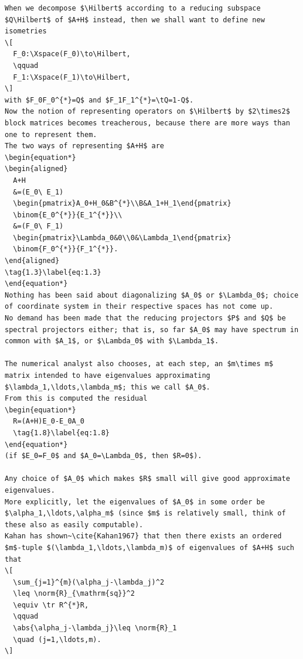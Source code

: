 \begin{verbatim}
When we decompose $\Hilbert$ according to a reducing subspace $Q\Hilbert$ of $A+H$ instead, then we shall want to define new isometries
\[
  F_0:\Xspace(F_0)\to\Hilbert,
  \qquad
  F_1:\Xspace(F_1)\to\Hilbert,
\]
with $F_0F_0^{*}=Q$ and $F_1F_1^{*}=\tQ=1-Q$.
Now the notion of representing operators on $\Hilbert$ by $2\times2$ block matrices becomes treacherous, because there are more ways than one to represent them.
The two ways of representing $A+H$ are
\begin{equation*}
\begin{aligned}
  A+H
  &=(E_0\ E_1)
  \begin{pmatrix}A_0+H_0&B^{*}\\B&A_1+H_1\end{pmatrix}
  \binom{E_0^{*}}{E_1^{*}}\\
  &=(F_0\ F_1)
  \begin{pmatrix}\Lambda_0&0\\0&\Lambda_1\end{pmatrix}
  \binom{F_0^{*}}{F_1^{*}}.
\end{aligned}
\tag{1.3}\label{eq:1.3}
\end{equation*}
Nothing has been said about diagonalizing $A_0$ or $\Lambda_0$; choice of coordinate system in their respective spaces has not come up.
No demand has been made that the reducing projectors $P$ and $Q$ be spectral projectors either; that is, so far $A_0$ may have spectrum in common with $A_1$, or $\Lambda_0$ with $\Lambda_1$.

The numerical analyst also chooses, at each step, an $m\times m$ matrix intended to have eigenvalues approximating $\lambda_1,\ldots,\lambda_m$; this we call $A_0$.
From this is computed the residual
\begin{equation*}
  R=(A+H)E_0-E_0A_0
  \tag{1.8}\label{eq:1.8}
\end{equation*}
(if $E_0=F_0$ and $A_0=\Lambda_0$, then $R=0$).

Any choice of $A_0$ which makes $R$ small will give good approximate eigenvalues.
More explicitly, let the eigenvalues of $A_0$ in some order be $\alpha_1,\ldots,\alpha_m$ (since $m$ is relatively small, think of these also as easily computable).
Kahan has shown~\cite{Kahan1967} that then there exists an ordered $m$-tuple $(\lambda_1,\ldots,\lambda_m)$ of eigenvalues of $A+H$ such that
\[
  \sum_{j=1}^{m}(\alpha_j-\lambda_j)^2
  \leq \norm{R}_{\mathrm{sq}}^2
  \equiv \tr R^{*}R,
  \qquad
  \abs{\alpha_j-\lambda_j}\leq \norm{R}_1
  \quad (j=1,\ldots,m).
\]


\end{verbatim}
